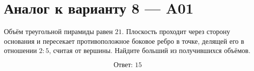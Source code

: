 \documentclass[12pt,a4paper]{article}
\begin{document}
\section*{Аналог к варианту 8 — A01}

Объём треугольной пирамиды равен \(21\). Плоскость проходит через сторону основания и пересекает противоположное боковое ребро в точке, делящей его в отношении \(2:5\), считая от вершины. Найдите больший из получившихся объёмов.

\begin{center}
\end{center}

\[
\boxed{\text{Ответ: }15}
\]
\end{document}
